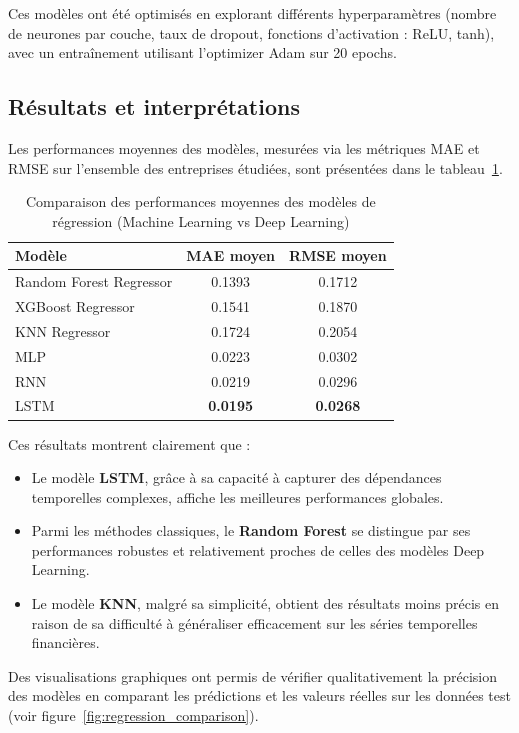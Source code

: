 \documentclass[a4paper,12pt]{article}
\begin{document}
Ces modèles ont été optimisés en explorant différents hyperparamètres (nombre de neurones par couche, taux de dropout, fonctions d’activation : ReLU, tanh), avec un entraînement utilisant l’optimizer Adam sur 20 epochs.

\subsection*{Résultats et interprétations}

Les performances moyennes des modèles, mesurées via les métriques MAE et RMSE sur l'ensemble des entreprises étudiées, sont présentées dans le tableau~\ref{tab:regression_results}.

\begin{table}[h!]
\centering
\begin{tabular}{|l|c|c|}
\hline
\textbf{Modèle} & \textbf{MAE moyen} & \textbf{RMSE moyen}\\
\hline
Random Forest Regressor & 0.1393 & 0.1712\\
XGBoost Regressor & 0.1541 & 0.1870\\
KNN Regressor & 0.1724 & 0.2054\\
MLP & 0.0223 & 0.0302\\
RNN & 0.0219 & 0.0296\\
LSTM & \textbf{0.0195} & \textbf{0.0268}\\
\hline
\end{tabular}
\caption{Comparaison des performances moyennes des modèles de régression (Machine Learning vs Deep Learning)}
\label{tab:regression_results}
\end{table}

Ces résultats montrent clairement que :
\begin{itemize}
    \item Le modèle \textbf{LSTM}, grâce à sa capacité à capturer des dépendances temporelles complexes, affiche les meilleures performances globales.
    \item Parmi les méthodes classiques, le \textbf{Random Forest} se distingue par ses performances robustes et relativement proches de celles des modèles Deep Learning.
    \item Le modèle \textbf{KNN}, malgré sa simplicité, obtient des résultats moins précis en raison de sa difficulté à généraliser efficacement sur les séries temporelles financières.
\end{itemize}

Des visualisations graphiques ont permis de vérifier qualitativement la précision des modèles en comparant les prédictions et les valeurs réelles sur les données test (voir figure~\ref{fig:regression_comparison}).
\end{document}
